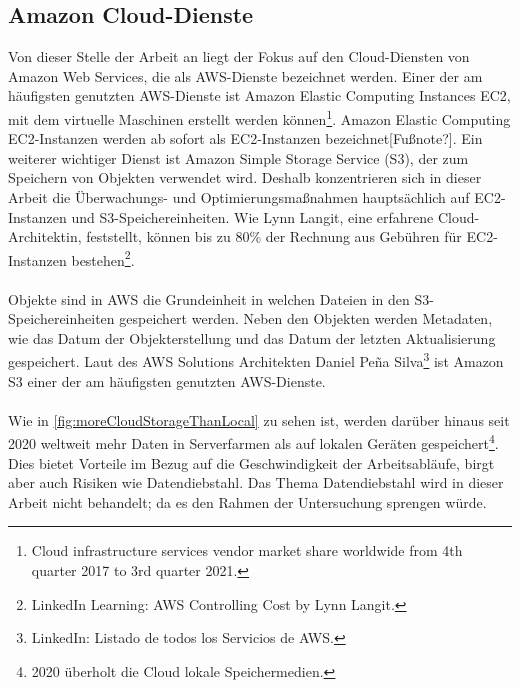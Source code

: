 \subsection{Amazon Cloud-Dienste}%
Von dieser Stelle der Arbeit an liegt der Fokus auf den Cloud-Diensten von Amazon Web Services, die als AWS-Dienste bezeichnet werden. Einer der am häufigsten genutzten AWS-Dienste ist Amazon Elastic Computing Instances EC2, mit dem virtuelle Maschinen erstellt werden können\footnote{Cloud infrastructure services vendor market share worldwide from 4th quarter 2017 to 3rd quarter 2021.\cite{STA4}}. Amazon Elastic Computing EC2-Instanzen werden ab sofort als EC2-Instanzen bezeichnet[Fußnote?]. Ein weiterer wichtiger Dienst ist Amazon Simple Storage Service (S3), der zum Speichern von Objekten verwendet wird. Deshalb konzentrieren sich in dieser Arbeit die Überwachungs- und Optimierungsmaßnahmen hauptsächlich auf EC2-Instanzen und S3-Speichereinheiten. %
Wie Lynn Langit, eine erfahrene Cloud-Architektin, feststellt, können bis zu 80\% der Rechnung aus Gebühren für EC2-Instanzen bestehen\footnote{LinkedIn Learning: AWS Controlling Cost by Lynn Langit.\cite{LINK2}}.%
\\\\
Objekte sind in AWS die Grundeinheit in welchen Dateien in den S3-Speichereinheiten gespeichert werden. Neben den Objekten werden Metadaten, wie das Datum der Objekterstellung und das Datum der letzten Aktualisierung gespeichert. Laut 
des AWS Solutions Architekten Daniel Peña Silva\footnote{LinkedIn: Listado de todos los Servicios de AWS.\cite{LINK1}} ist Amazon S3 einer der am häufigsten genutzten AWS-Dienste.
\\\\
Wie in \autoref{fig:moreCloudStorageThanLocal} zu sehen ist, werden darüber hinaus seit 2020 weltweit mehr Daten in Serverfarmen als auf lokalen Geräten gespeichert\footnote{2020 überholt die Cloud lokale Speichermedien.\cite{STA1}}. Dies bietet Vorteile im Bezug auf die Geschwindigkeit der Arbeitsabläufe, birgt aber auch Risiken wie Datendiebstahl. Das Thema Datendiebstahl wird in dieser Arbeit nicht behandelt; da es den Rahmen der Untersuchung sprengen würde.
